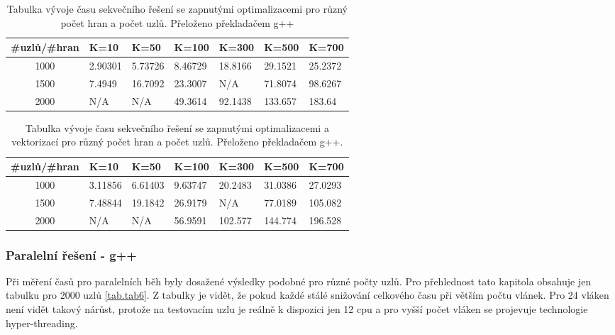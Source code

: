 \documentclass[a4paper,11pt]{article}
\begin{document}
   \begin{table}[ht]
  \begin{center}
   \begin{tabular}{|c|l|l|l|l|l|l|}
    \hline 
    \#uzlů/\#hran & K=10 & K=50 & K=100 & K=300 & K=500 & K=700\\
   \hline 
   1000 & 2.90301 & 5.73726 & 8.46729 & 18.8166  & 29.1521 & 25.2372\\
   \hline
    1500 & 7.4949 & 16.7092 & 23.3007 & N/A & 71.8074 & 98.6267\\
    \hline
    2000 & N/A & N/A & 49.3614 & 92.1438 & 133.657 & 183.64\\
    \hline
    \end{tabular}
   \caption{Tabulka vývoje času sekvečního řešení se zapnutými optimalizacemi pro různý počet hran a počet uzlů. Přeloženo 
   překladačem g++} 
   \label{tab.tab2}
  \end{center}   
  \end{table}
  
    \begin{table}[ht]
  \begin{center}
   \begin{tabular}{|c|l|l|l|l|l|l|}
    \hline 
    \#uzlů/\#hran & K=10 & K=50 & K=100 & K=300 & K=500 & K=700\\
   \hline 
   \hline 
   1000 & 3.11856 & 6.61403 & 9.63747 & 20.2483  & 31.0386 & 27.0293\\
   \hline
    1500 & 7.48844 & 19.1842 & 26.9179 & N/A  & 77.0189 & 105.082\\
    \hline
    2000 & N/A & N/A & 56.9591 & 102.577 & 144.774 & 196.528\\
    \hline
    \end{tabular}
   \caption{Tabulka vývoje času sekvečního řešení se zapnutými optimalizacemi a vektorizací pro různý počet hran a počet uzlů. Přeloženo 
   překladačem g++.} 
   \label{tab.tab3}
  \end{center}   
  \end{table}
  
\subsubsection{Paralelní řešení - g++}
  Při měření časů pro paralelních běh byly dosažené výsledky podobné pro různé počty uzlů. Pro přehlednost
  tato kapitola obsahuje jen tabulku pro 2000 uzlů \ref{tab.tab6}. Z tabulky je vidět, že pokud každé stálé snižování celkového
  času při větším počtu vlánek. Pro 24 vláken není vidět takový nárůst, protože na testovacím uzlu je reálně
  k dispozici jen 12 cpu a pro vyšší počet vláken se projevuje technologie hyper-threading.
  
\end{document}
